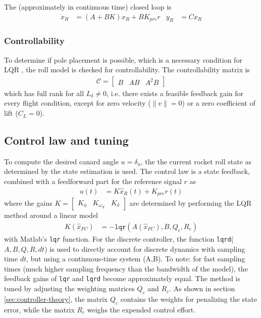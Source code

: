The (approximately in continuous time) closed loop is 
\begin{align}
    \dot x_R &= (A+BK) x_R + B K_{pre} r & y_R &= C x_R
    \label{eq:controller-closedloop}
\end{align}

\subsubsection{Controllability}
To determine if pole placement is possible, which is a necessary condition for LQR \cite{werner2021}, the roll model is checked for controllability.
The controllability matrix is 
\begin{align}
    \mathcal{C} = \begin{bmatrix}
        B & AB & A^2 B 
    \end{bmatrix}
\end{align}
which has full rank for all $L_\delta \neq 0$, i.e. there exists a feasible feedback gain for every flight condition, except for zero velocity ($\lVert v \rVert = 0$) or a zero coefficient of lift ($C_L = 0$).

\subsection{Control law and tuning}
To compute the desired canard angle $u = \delta_u$, the the current rocket roll state as determined by the state estimation is used.
The control law is a state feedback, combined with a feedforward part for the reference signal $r$ as
\begin{align}
    u(t) &= K \hat x_R(t) + K_{pre} r(t)
\end{align}
where the gains $K = \begin{bmatrix} K_\phi & K_{\omega_X} & K_\delta \end{bmatrix}$ are determined by performing the LQR method around a linear model
\begin{align}
    K(\hat x_{FC}) &= -\texttt{lqr}(A(\hat x_{FC}),B,Q_{c},R_{c}) 
\end{align}
with Matlab's \texttt{lqr} function. 
For the discrete controller, the function \texttt{lqrd}($A, B, Q, R, dt$) is used to directly account for discrete dynamics with sampling time $dt$, but using a continuous-time system (A,B). 
To note: for fast sampling times (much higher sampling frequency than the bandwidth of the model), the feedback gains of \texttt{lqr} and \texttt{lqrd} become approximately equal.
The method is tuned by adjusting the weighting matrices $Q_c$ and $R_c$.
As shown in section \ref{sec:controller-theory}, the matrix $Q_c$ contains the weights for penalizing the state error, while the matrix $R_c$ weighs the expended control effort.

